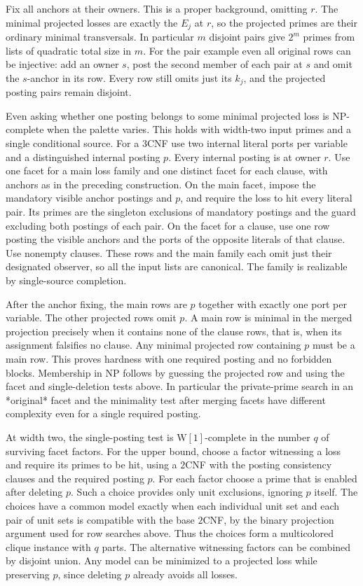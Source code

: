 Fix all anchors at their owners. This is a proper
background, omitting $r$. The minimal projected
losses are exactly the $E_j$ at $r$, so the projected
primes are their ordinary minimal transversals.
In particular $m$ disjoint pairs give $2^m$ primes
from lists of quadratic total size in $m$. For the
pair example even all original rows can be injective:
add an owner $s$, post the second member of each
pair at $s$ and omit the $s$-anchor in its row.
Every row still omits just its $k_j$, and the
projected posting pairs remain disjoint.

Even asking whether one posting belongs to some
minimal projected loss is NP-complete when the
palette varies. This holds with width-two input
primes and a single conditional source. For a
$3$CNF use two internal literal ports per variable
and a distinguished internal posting $p$.
Every internal posting is at owner $r$. Use one
facet for a main loss family and one distinct facet
for each clause, with anchors as in the preceding
construction. On the main facet, impose the
mandatory visible anchor postings and $p$, and
require the loss to hit every literal pair. Its
primes are the singleton exclusions of mandatory
postings and the guard excluding both postings
of each pair.
On the facet for a clause, use one row posting the
visible anchors and the ports of the opposite
literals of that clause. Use nonempty clauses.
These rows and the main family each omit just
their designated observer, so all the input
lists are canonical. The family is realizable by
single-source completion.

After the anchor fixing, the main rows are $p$
together with exactly one port per variable.
The other projected rows omit $p$. A main row
is minimal in the merged projection precisely
when it contains none of the clause rows, that
is, when its assignment falsifies no clause.
Any minimal projected row containing $p$ must
be a main row. This proves hardness with one
required posting and no forbidden blocks.
Membership in NP follows by guessing the
projected row and using the facet and
single-deletion tests above. In particular
the private-prime search in an *original*
facet and the minimality test after merging
facets have different complexity even for a
single required posting.

At width two, the single-posting test is
$\mathrm W[1]$-complete in the number $q$ of
surviving facet factors. For the upper bound,
choose a factor witnessing a loss and require
its primes to be hit, using a $2$CNF with the
posting consistency clauses and the required
posting $p$. For each factor choose a prime
that is enabled after deleting $p$. Such a choice
provides only unit exclusions, ignoring $p$
itself. The choices have a common model exactly
when each individual unit set and each pair of
unit sets is compatible with the base $2$CNF,
by the binary projection argument used for row
searches above. Thus the choices form a
multicolored clique instance with $q$ parts.
The alternative witnessing factors can be
combined by disjoint union. Any model can be
minimized to a projected loss while preserving
$p$, since deleting $p$ already avoids all
losses.


